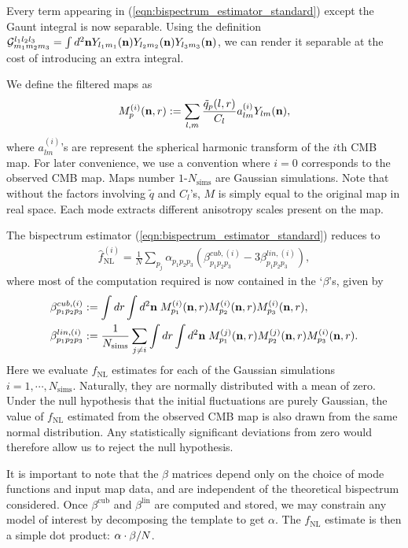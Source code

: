 Every term appearing in (\ref{eqn:bispectrum_estimator_standard}) except the Gaunt integral is now separable. Using the definition $\mathcal{G}^{l_1 l_2 l_3}_{m_1 m_2 m_3} = \int d^2 \mathbf{n} Y_{l_1 m_1}(\mathbf{n}) Y_{l_2 m_2}(\mathbf{n}) Y_{l_3 m_3}(\mathbf{n})$, we can render it separable at the cost of introducing an extra integral.

We define the filtered maps as
\begin{align}
	M^{(i)}_p (\mathbf{n}, r) := \sum_{l,m} \frac{\tilde{q}_p (l,r)}{C_l} a^{(i)}_{lm} Y_{lm} (\mathbf{n}), \label{def:filtered_maps}
\end{align}
where $a^{(i)}_{lm}$'s are represent the spherical harmonic transform of the $i$th CMB map. For later convenience, we use a convention where $i=0$ corresponds to the observed CMB map. Maps number $1$-$N_\text{sims}$ are Gaussian simulations. Note that without the factors involving $\tilde{q}$ and $C_l$'s, $M$ is simply equal to the original map in real space. Each mode extracts different anisotropy scales present on the map.

The bispectrum estimator (\ref{eqn:bispectrum_estimator_standard}) reduces to
\begin{align}
	\hat{f}_\text{NL}^{(i)} = \frac{1}{N} \sum_{p_j} \alpha_{p_1 p_2 p_3} (\beta^{cub,(i)}_{p_1 p_2 p_3} - 3 \beta^{lin,(i)}_{p_1 p_2 p_3}), \label{eqn:fNL_from_betas}
\end{align}
where most of the computation required is now contained in the `$\beta$'s, given by
\begin{align}
	\beta^{cub,(i)}_{p_1 p_2 p_3} &:= \int dr \int d^2\mathbf{n} \; M^{(i)}_{p_1} (\mathbf{n},r) M^{(i)}_{p_2} (\mathbf{n},r) M^{(i)}_{p_3} (\mathbf{n},r),	\label{def:beta_cubic} \\
	\beta^{lin,(i)}_{p_1 p_2 p_3} &:= \frac{1}{N_\text{sims}} \sum_{j \neq i} \int dr \int d^2\mathbf{n} \; M^{(j)}_{p_1} (\mathbf{n},r) M^{(j)}_{p_2} (\mathbf{n},r) M^{(i)}_{p_3} (\mathbf{n},r). \label{def:beta_linear}
\end{align}
Here we evaluate $f_\text{NL}$ estimates for each of the Gaussian simulations $i=1,\cdots,N_\text{sims}$. Naturally, they are normally distributed with a mean of zero. Under the null hypothesis that the initial fluctuations are purely Gaussian, the value of $f_\text{NL}$ estimated from the observed CMB map is also drawn from the same normal distribution. Any statistically significant deviations from zero would therefore allow us to reject the null hypothesis.

It is important to note that the $\beta$ matrices depend only on the choice of mode functions and input map data, and are independent of the theoretical bispectrum considered. Once $\beta^\text{cub}$ and $\beta^\text{lin}$ are computed and stored, we may constrain any model of interest by decomposing the template to get $\alpha$. The $f_\text{NL}$ estimate is then  a simple dot product: $\mathbf{\alpha} \cdot \mathbf{\beta} / N$.


